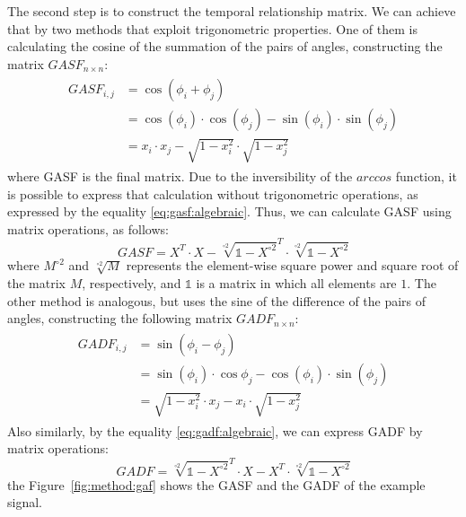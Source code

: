 

The second step is to construct the temporal relationship matrix. We can achieve that by two methods that exploit trigonometric properties. One of them is calculating the cosine of the summation of the pairs of angles, constructing the matrix $GASF_{n \times n}$:
\begin{align}
\begin{split}
    GASF_{i,j}     & = \cos(\phi_i + \phi_j) \\
            & = \cos(\phi_i) \cdot \cos(\phi_j) - \sin(\phi_i) \cdot \sin(\phi_j) \\
            & = x_i \cdot x_j - \sqrt{1 - x_i^2} \cdot \sqrt{1 - x_j^2} \label{eq:gasf:algebraic}
\end{split}
\end{align}
\noindent where \gls{GASF} is the final matrix. Due to the inversibility of the $arccos$ function, it is possible to express that calculation without trigonometric operations, as expressed by the equality \ref{eq:gasf:algebraic}. Thus, we can calculate \gls{GASF} using matrix operations, as follows:  
\begin{equation}
    GASF = X^T \cdot X - \sqrt[\circ 2]{\mathds{1}-X^{\circ 2}}^T \cdot \sqrt[\circ 2]{\mathds{1}-X^{\circ 2}}
\end{equation}
\noindent where $M^{\circ 2}$ and $\sqrt[\circ 2]{M}$ represents the element-wise square power and square root of the matrix $M$, respectively, and $\mathds{1}$ is a matrix in which all elements are $1$. The other method is analogous, but uses the sine of the difference of the pairs of angles, constructing the following matrix $GADF_{n \times n}$:
\begin{align}
\begin{split}
    GADF_{i,j} & = \sin(\phi_i - \phi_j) \\
        & = \sin(\phi_i) \cdot \cos{\phi_j} - \cos(\phi_i) \cdot \sin(\phi_j) \\
        & = \sqrt{1 - x_i^2} \cdot x_j - x_i \cdot \sqrt{1 - x_j^2}  \label{eq:gadf:algebraic}
\end{split}
\end{align}
\noindent Also similarly, by the equality \ref{eq:gadf:algebraic}, we can express \gls{GADF} by matrix operations:
\begin{equation}
    GADF = \sqrt[\circ 2]{\mathds{1} - X^{\circ 2}}^T \cdot X - X^T \cdot \sqrt[\circ 2]{\mathds{1} - X^{\circ 2}}
\end{equation}
\noindent the Figure~\ref{fig:method:gaf} shows the \gls{GASF} and the \gls{GADF} of the example signal.

